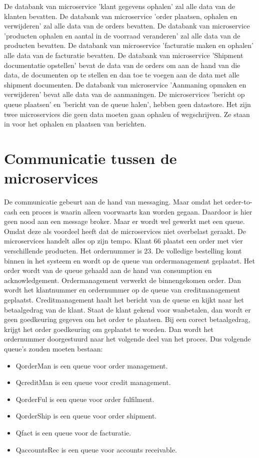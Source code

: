 De databank van microservice 'klant gegevens ophalen' zal alle data van de klanten bevatten.
De databank van microservice 'order plaatsen, ophalen en verwijderen' zal alle data van de orders bevatten.
De databank van microservice 'producten ophalen en aantal in de voorraad veranderen' zal alle data van de producten bevatten.
De databank van microservice 'facturatie maken en ophalen' alle data van de facturatie bevatten.
De databank van microservice 'Shipment documentatie opstellen' bevat de data van de orders om aan de hand van die data, de documenten op te stellen en dan toe te voegen aan de data met alle shipment documenten.
De databank van microservice 'Aanmaning opmaken en verwijderen' bevat alle data van de aanmaningen. 
De microservices 'bericht op queue plaatsen' en 'bericht van de queue halen', hebben geen datastore. Het zijn twee microservices die geen data moeten gaan ophalen of wegschrijven. Ze staan in voor het ophalen en plaatsen van berichten. 

\section{Communicatie tussen de microservices}
De communicatie gebeurt aan de hand van messaging. Maar omdat het order-to-cash een proces is waarin alleen voorwaarts kan worden gegaan. Daardoor is hier geen nood aan een message broker. Maar er wordt wel gewerkt met een queue. Omdat deze als voordeel heeft dat de microservices niet overbelast geraakt. De microservices handelt alles op zijn tempo. 
Klant 66 plaatst een order met vier verschillende producten. Het ordernummer is 23. De volledige bestelling komt binnen in het systeem en wordt op de queue van ordermanagement geplaatst. Het order wordt van de queue gehaald aan de hand van consumption en acknowledgement. Ordermanagement verwerkt de binnengekomen order. Dan wordt het klantnummer en ordernummer op de queue van creditmanagement geplaatst. Creditmanagement haalt het bericht van de queue en kijkt naar het betaalgedrag van de klant. Staat de klant gekend voor wanbetalen, dan wordt er geen goedkeuring gegeven om het order te plaatsen. Bij een corect betaalgedrag, krijgt het order goedkeuring om geplaatst te worden. Dan wordt het ordernummer doorgestuurd naar het volgende deel van het proces. 
Dus volgende queue's zouden moeten bestaan:
\begin{itemize}
	\item QorderMan is een queue voor order management.
	\item QcreditMan is een queue voor credit management.
	\item QorderFul is een queue voor order fulfilment.
	\item QorderShip is een queue voor order shipment.
	\item Qfact is een queue voor de facturatie.
	\item QaccountsRec is een queue voor accounts receivable. 
\end{itemize}

